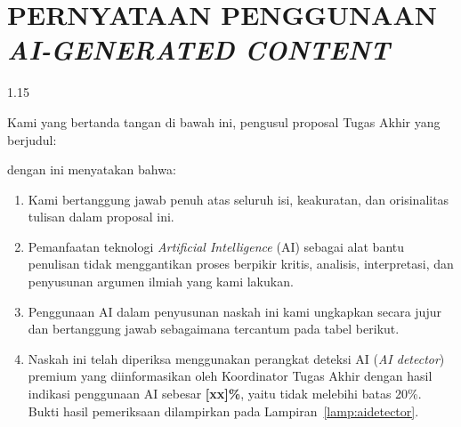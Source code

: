 \chapter*{\centering PERNYATAAN PENGGUNAAN \textit{AI-GENERATED CONTENT}}
\begin{spacing}{1.15}

\noindent Kami yang bertanda tangan di bawah ini, pengusul proposal Tugas Akhir yang berjudul:
\begin{center}
  \textbf{\textit{\judulusulan}}
\end{center}
dengan ini menyatakan bahwa:
\begin{enumerate}
  \item Kami bertanggung jawab penuh atas seluruh isi, keakuratan, dan orisinalitas tulisan dalam proposal ini.
  \item Pemanfaatan teknologi \textit{Artificial Intelligence} (AI) sebagai alat bantu penulisan tidak menggantikan proses berpikir kritis, analisis, interpretasi, dan penyusunan argumen ilmiah yang kami lakukan.
  \item Penggunaan AI dalam penyusunan naskah ini kami ungkapkan secara jujur dan bertanggung jawab sebagaimana tercantum pada tabel berikut.
  \item Naskah ini telah diperiksa menggunakan perangkat deteksi AI (\textit{AI detector}) premium yang diinformasikan oleh Koordinator Tugas Akhir dengan hasil indikasi penggunaan AI sebesar \textbf{[xx]\%}, yaitu tidak melebihi batas 20\%. Bukti hasil pemeriksaan dilampirkan pada Lampiran~\ref{lamp:aidetector}.
\end{enumerate}



\end{spacing}
